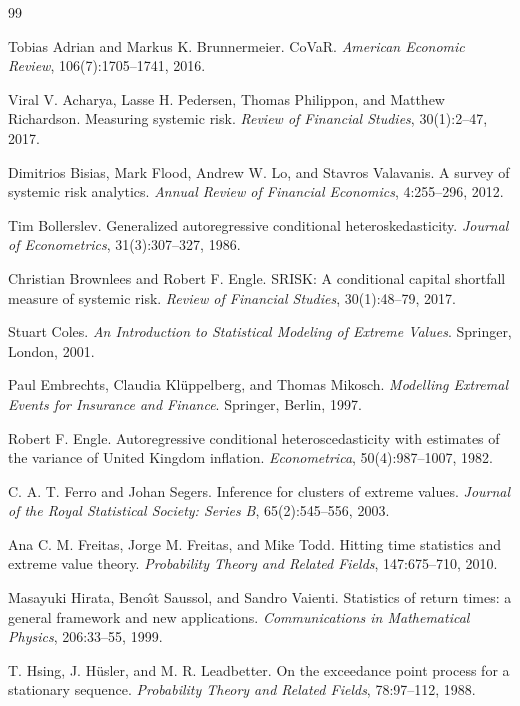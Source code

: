\documentclass[11pt]{article}
\begin{document}
{\raggedright
\begin{thebibliography}{99}

Tobias Adrian and Markus K. Brunnermeier.
CoVaR.
\textit{American Economic Review}, 106(7):1705--1741, 2016.

Viral V. Acharya, Lasse H. Pedersen, Thomas Philippon, and Matthew Richardson.
Measuring systemic risk.
\textit{Review of Financial Studies}, 30(1):2--47, 2017.

Dimitrios Bisias, Mark Flood, Andrew W. Lo, and Stavros Valavanis.
A survey of systemic risk analytics.
\textit{Annual Review of Financial Economics}, 4:255--296, 2012.

Tim Bollerslev.
Generalized autoregressive conditional heteroskedasticity.
\textit{Journal of Econometrics}, 31(3):307--327, 1986.

Christian Brownlees and Robert F. Engle.
SRISK: A conditional capital shortfall measure of systemic risk.
\textit{Review of Financial Studies}, 30(1):48--79, 2017.

Stuart Coles.
\textit{An Introduction to Statistical Modeling of Extreme Values}.
Springer, London, 2001.

Paul Embrechts, Claudia Kl\"uppelberg, and Thomas Mikosch.
\textit{Modelling Extremal Events for Insurance and Finance}.
Springer, Berlin, 1997.

Robert F. Engle.
Autoregressive conditional heteroscedasticity with estimates of the variance of United Kingdom inflation.
\textit{Econometrica}, 50(4):987--1007, 1982.

C. A. T. Ferro and Johan Segers.
Inference for clusters of extreme values.
\textit{Journal of the Royal Statistical Society: Series B}, 65(2):545--556, 2003.

Ana C. M. Freitas, Jorge M. Freitas, and Mike Todd.
Hitting time statistics and extreme value theory.
\textit{Probability Theory and Related Fields}, 147:675--710, 2010.

Masayuki Hirata, Beno\^\i t Saussol, and Sandro Vaienti.
Statistics of return times: a general framework and new applications.
\textit{Communications in Mathematical Physics}, 206:33--55, 1999.

T. Hsing, J. H\"usler, and M. R. Leadbetter.
On the exceedance point process for a stationary sequence.
\textit{Probability Theory and Related Fields}, 78:97--112, 1988.


\end{thebibliography}}
\end{document}
